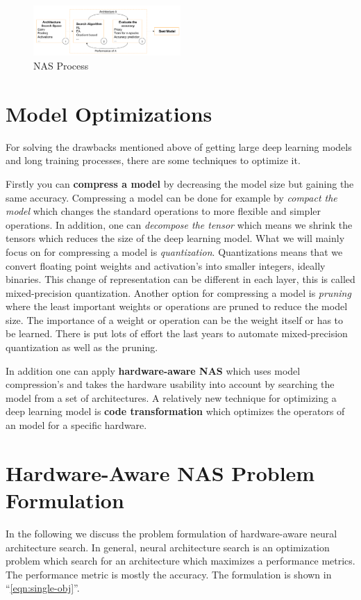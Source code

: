 \documentclass[conference]{IEEEtran}
\begin{document}
\begin{figure}[htbp]
\includegraphics[width=0.5\textwidth]{NASProcess.png}
\caption{NAS Process\cite{bib1}}
\label{fig:NASProcess}
\end{figure}

\section{Model Optimizations}
\label{section:ModelOptimization}
For solving the drawbacks mentioned above of getting large deep learning models and long training processes, there are some techniques to optimize it.

Firstly you can \textbf{compress a model} by decreasing the model size but gaining the same accuracy. Compressing a model can be done for example by \textit{compact the model} which changes the standard operations to more flexible and simpler operations. In addition, one can \textit{decompose the tensor} which means we shrink the tensors which reduces the size of the deep learning model. What we will mainly focus on for compressing a model is \textit{quantization}. Quantizations means that we convert floating point weights and activation's into smaller integers, ideally binaries. This change of representation can be different in each layer, this is called mixed-precision quantization. Another option for compressing a model is \textit{pruning} where the least important weights or operations are pruned to reduce the model size. The importance of a weight or operation can be the weight itself or has to be learned. There is put lots of effort the last years to automate mixed-precision quantization as well as the pruning. 

In addition one can apply \textbf{hardware-aware NAS} which uses model compression's and takes the hardware usability into account by searching the model from a set of architectures. A relatively new technique for optimizing a deep learning model is \textbf{code transformation} which optimizes the operators of an model for a specific hardware.

\section{Hardware-Aware NAS Problem Formulation}
\label{section:ProblemFormulation}
In the following we discuss the problem formulation of hardware-aware neural architecture search. In general, neural architecture search is an optimization problem which search for an architecture which maximizes a performance metrics. The performance metric is mostly the accuracy. The formulation is shown in ``\eqref{eqn:single-obj}''. 
 
\end{document}
